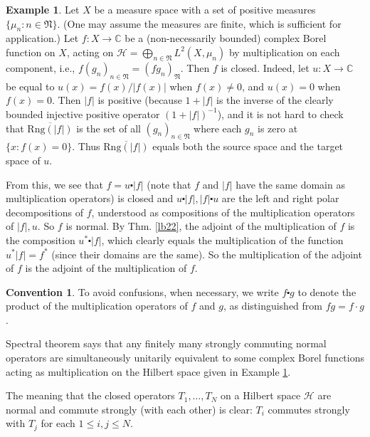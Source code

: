 \documentclass[12pt,a4paper,notitlepage]{article}
\theoremstyle{definition}
\newtheorem{eg}[df]{Example}
\newtheorem{cv}[df]{Convention}
\theoremstyle{plain}
\newcommand{\fk}{\mathfrak}
\newcommand{\mc}{\mathcal}
\newcommand{\ovl}{\overline}
\newcommand{\Cbb}{\mathbb C}
\newcommand{\Rng}{\mathrm{Rng}}
\numberwithin{equation}{section}
\begin{document}
\begin{eg}\label{lb33}
Let $X$ be a measure space  with a set of positive measures $\{\mu_n:n\in\fk N\}$. (One may assume the measures are finite, which is sufficient for application.) Let $f:X\rightarrow \Cbb$ be a (non-necessarily bounded) complex Borel function on $X$, acting on $\mc H=\bigoplus_{n\in\fk N} L^2(X,\mu_n)$ by multiplication on each component, i.e., $f(g_n)_{n\in\fk N}=(fg_n)_{\fk N}$. Then $f$ is closed. Indeed, let $u:X\rightarrow\Cbb$ be equal to $u(x)=f(x)/|f(x)|$ when $f(x)\neq 0$, and $u(x)=0$ when $f(x)=0$. Then $|f|$ is positive (because $1+|f|$ is the inverse of the clearly bounded injective positive operator $(1+|f|)^{-1}$), and it is not hard to check that $\ovl{\Rng(|f|)}$ is the set of all $(g_n)_{n\in\fk N}$ where each $g_n$ is zero at $\{x:f(x)=0\}$. Thus $\ovl{\Rng(|f|)}$ equals both the source space and the target space of $u$.
	
From this, we see that $f=u\centerdot |f|$ (note that $f$ and $|f|$ have the same domain as multiplication operators) is closed and $u\centerdot|f|,|f|\centerdot u$ are the left and right polar decompositions of $f$, understood as compositions of the multiplication operators of $|f|,u$. So $f$ is normal. By Thm. \ref{lb22}, the adjoint of the multiplication of $f$ is the composition $u^*\centerdot|f|$, which clearly equals the multiplication of the function $u^*|f|=f^*$ (since their domains are the same). So the multiplication of the adjoint of $f$ is the adjoint of the multiplication of $f$.
\end{eg}


\begin{cv}
To avoid confusions, when necessary, we write $f\centerdot g$ to denote the product of the multiplication operators of $f$ and $g$, as distinguished from $fg=f\cdot g$.
\end{cv}

Spectral theorem says that any  finitely many strongly commuting normal operators are simultaneously unitarily equivalent to some complex Borel functions acting as multiplication on the Hilbert space given in Example \ref{lb33}.


The meaning that the closed operators $T_1,\dots,T_N$ on a Hilbert space $\mc H$ are normal and commute strongly (with each other) is clear: $T_i$ commutes strongly with $T_j$ for each $1\leq i,j\leq N$.
\end{document}

